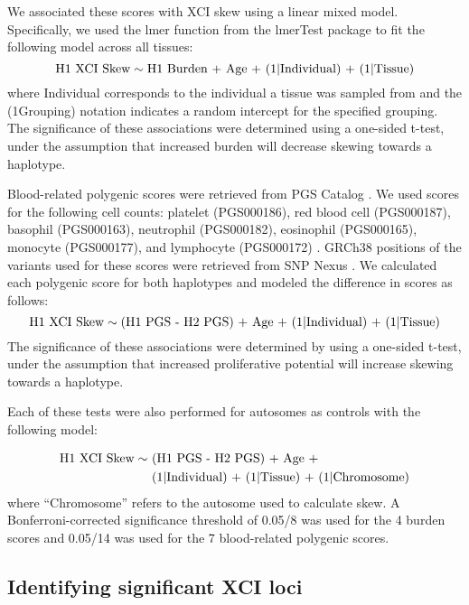 We associated these scores with XCI skew using a linear mixed model. Specifically, we used the lmer function from the lmerTest package \cite{Kuznetsova2017-jp} to fit the following model across all tissues:
\begin{equation}
\text{H1 XCI Skew} \sim \text{H1 Burden + Age + (1\textbar Individual) + (1\textbar Tissue)}
\end{equation}
where Individual corresponds to the individual a tissue was sampled from and the (1\textbar Grouping) notation indicates a random intercept for the specified grouping. The significance of these associations were determined using a one-sided t-test, under the assumption that increased burden will decrease skewing towards a haplotype.

Blood-related polygenic scores were retrieved from PGS Catalog \cite{Lambert2021-iu}. We used scores for the following cell counts: platelet (PGS000186), red blood cell (PGS000187), basophil (PGS000163), neutrophil (PGS000182), eosinophil (PGS000165), monocyte (PGS000177), and lymphocyte (PGS000172) \cite{Vuckovic2020-gf}. GRCh38 positions of the variants used for these scores were retrieved from SNP Nexus \cite{Oscanoa2020-ac}. We calculated each polygenic score for both haplotypes and modeled the difference in scores as follows:
\begin{equation}
\text{H1 XCI Skew} \sim \text{(H1 PGS - H2 PGS) + Age + (1\textbar Individual) + (1\textbar Tissue)}
\end{equation}
The significance of these associations were determined by using a one-sided t-test, under the assumption that increased proliferative potential will increase skewing towards a haplotype. 

Each of these tests were also performed for autosomes as controls with the following model:

\begin{align}
\begin{split}
\text{H1 XCI Skew} \sim & \text{ (H1 PGS - H2 PGS) + Age +} \\
                        & \text{ (1\textbar Individual) + (1\textbar Tissue) + (1\textbar Chromosome)}
\end{split}
\end{align}
where “Chromosome” refers to the autosome used to calculate skew. A Bonferroni-corrected significance threshold of 0.05/8 was used for the 4 burden scores and 0.05/14 was used for the 7 blood-related polygenic scores. 

\subsection{Identifying significant XCI loci}

